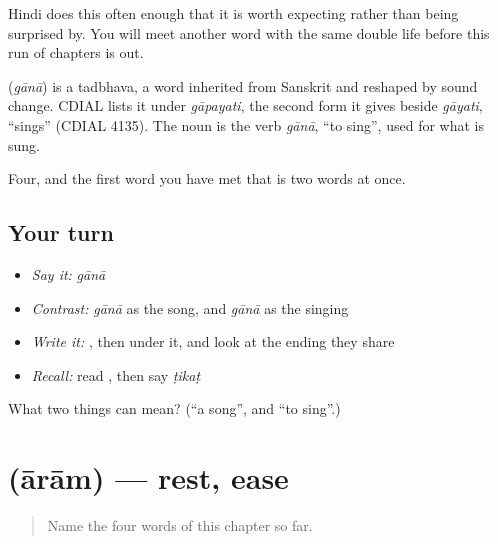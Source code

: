 Hindi does this often enough that it is worth expecting rather than being surprised by. You will meet another word with the same double life before this run of chapters is out.

\begin{cousinweb}
\textbf{} (\emph{gānā}) is a tadbhava, a word inherited from Sanskrit and reshaped by sound change. CDIAL lists it under \emph{gāpayati}, the second form it gives beside \emph{gāyati}, \textquotedblleft{}sings\textquotedblright{} (CDIAL 4135). The noun is the verb \emph{gānā}, \textquotedblleft{}to sing\textquotedblright{}, used for what is sung.
\end{cousinweb}

\begin{grammarlens}[title={What you've built}]
Four, and the first word you have met that is two words at once.
\end{grammarlens}

\subsection*{Your turn}
\begin{itemize}
\raggedright
  \item \emph{Say it:} \emph{gānā}
  \item \emph{Contrast:} \emph{gānā} as the song, and \emph{gānā} as the singing
  \item \emph{Write it:} , then  under it, and look at the ending they share
  \item \emph{Recall:} read \textbf{}, then say \emph{ṭikaṭ}
\end{itemize}

\begin{tcolorbox}[breakable,colback=teal!4,colframe=teal!35!black,title={Before you move on}]
What two things can  mean? (\textquotedblleft{}a song\textquotedblright{}, and \textquotedblleft{}to sing\textquotedblright{}.)
\end{tcolorbox}
\section[\texorpdfstring{\hi{आराम} (ārām)}{आराम (ārām)}]{ (ārām) — rest, ease}

\label{lesson:HI-C70-rest}



\begin{quote}
Name the four words of this chapter so far.
\end{quote}

